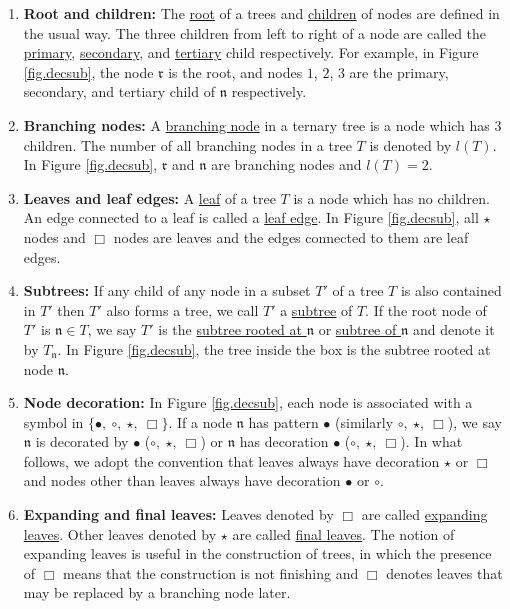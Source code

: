 \begin{defn}
\begin{enumerate}
 \item \textbf{Root and children:} The \underline{root} of a trees and \underline{children} of nodes are defined in the usual way. The three children from left to right of a node are called the \underline{primary}, \underline{secondary}, and \underline{tertiary} child respectively. For example, in Figure \ref{fig.decsub}, the node $\mathfrak{r}$ is the root, and nodes $1$, $2$, $3$ are the primary, secondary, and tertiary child of $\mathfrak{n}$ respectively.
 \item \textbf{Branching nodes:} A \underline{branching node} in a ternary tree is a node which has $3$ children. The number of all branching nodes in a tree $T$ is denoted by $l(T)$. In Figure \ref{fig.decsub}, $\mathfrak{r}$ and $\mathfrak{n}$ are branching nodes and $l(T)=2$.
 \item \textbf{Leaves and leaf edges:} A \underline{leaf} of a tree $T$ is a node which has no children. An edge connected to a leaf is called a \underline{leaf edge}. In Figure \ref{fig.decsub}, all $\star$ nodes and $\Box$ nodes are leaves and the edges connected to them are leaf edges.
 \item \textbf{Subtrees:} If any child of any node in a subset $T'$ of a tree $T$ is also contained in $T'$ then $T' $ also forms a tree, we call $T'$ a \underline{subtree} of $T$. If the root node of $T'$ is $\mathfrak{n}\in T$, we say $T'$ is the \underline{subtree rooted at $\mathfrak{n}$} or \underline{subtree of $\mathfrak{n}$} and denote it by $T_\mathfrak{n}$. In Figure \ref{fig.decsub}, the tree inside the box is the subtree rooted at node $\mathfrak{n}$.
 \item \textbf{Node decoration:} In Figure \ref{fig.decsub}, each node is associated with a symbol in $\{\bullet,\ \circ,\ \star,\ \Box\}$. If a node $\mathfrak{n}$ has pattern $\bullet$ (similarly $ \circ,\ \star,\ \Box$), we say $\mathfrak{n}$ is decorated by $\bullet$ ($ \circ,\ \star,\ \Box$) or $\mathfrak{n}$ has decoration $\bullet$ ($ \circ,\ \star,\ \Box$). In what follows, we adopt the convention that leaves always have decoration $\star$ or $\Box$ and nodes other than leaves always have decoration $\bullet$ or $\circ$.
 
 \item \textbf{Expanding and final leaves:} Leaves denoted by $\Box$ are called \underline{expanding leaves}. Other leaves denoted by $\star$ are called \underline{final leaves}. The notion of expanding leaves is useful in the construction of trees, in which the presence of $\Box$ means that the construction is not finishing and $\Box$ denotes leaves that may be replaced by a branching node later.
 

\end{enumerate}
\end{defn}
